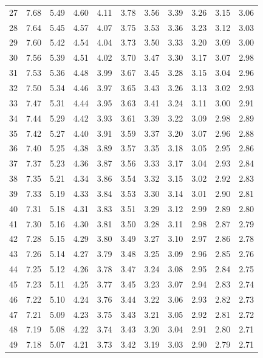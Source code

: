 \documentclass[
]{book}
\theoremstyle{definition}
\theoremstyle{definition}
\theoremstyle{definition}
\theoremstyle{definition}
\theoremstyle{remark}
\begin{document}
\begin{longtable}[]{@{}ccccccccccc@{}}
27 & 7.68 & 5.49 & 4.60 & 4.11 & 3.78 & 3.56 & 3.39 & 3.26 & 3.15 & 3.06 \\
28 & 7.64 & 5.45 & 4.57 & 4.07 & 3.75 & 3.53 & 3.36 & 3.23 & 3.12 & 3.03 \\
29 & 7.60 & 5.42 & 4.54 & 4.04 & 3.73 & 3.50 & 3.33 & 3.20 & 3.09 & 3.00 \\
30 & 7.56 & 5.39 & 4.51 & 4.02 & 3.70 & 3.47 & 3.30 & 3.17 & 3.07 & 2.98 \\
31 & 7.53 & 5.36 & 4.48 & 3.99 & 3.67 & 3.45 & 3.28 & 3.15 & 3.04 & 2.96 \\
32 & 7.50 & 5.34 & 4.46 & 3.97 & 3.65 & 3.43 & 3.26 & 3.13 & 3.02 & 2.93 \\
33 & 7.47 & 5.31 & 4.44 & 3.95 & 3.63 & 3.41 & 3.24 & 3.11 & 3.00 & 2.91 \\
34 & 7.44 & 5.29 & 4.42 & 3.93 & 3.61 & 3.39 & 3.22 & 3.09 & 2.98 & 2.89 \\
35 & 7.42 & 5.27 & 4.40 & 3.91 & 3.59 & 3.37 & 3.20 & 3.07 & 2.96 & 2.88 \\
36 & 7.40 & 5.25 & 4.38 & 3.89 & 3.57 & 3.35 & 3.18 & 3.05 & 2.95 & 2.86 \\
37 & 7.37 & 5.23 & 4.36 & 3.87 & 3.56 & 3.33 & 3.17 & 3.04 & 2.93 & 2.84 \\
38 & 7.35 & 5.21 & 4.34 & 3.86 & 3.54 & 3.32 & 3.15 & 3.02 & 2.92 & 2.83 \\
39 & 7.33 & 5.19 & 4.33 & 3.84 & 3.53 & 3.30 & 3.14 & 3.01 & 2.90 & 2.81 \\
40 & 7.31 & 5.18 & 4.31 & 3.83 & 3.51 & 3.29 & 3.12 & 2.99 & 2.89 & 2.80 \\
41 & 7.30 & 5.16 & 4.30 & 3.81 & 3.50 & 3.28 & 3.11 & 2.98 & 2.87 & 2.79 \\
42 & 7.28 & 5.15 & 4.29 & 3.80 & 3.49 & 3.27 & 3.10 & 2.97 & 2.86 & 2.78 \\
43 & 7.26 & 5.14 & 4.27 & 3.79 & 3.48 & 3.25 & 3.09 & 2.96 & 2.85 & 2.76 \\
44 & 7.25 & 5.12 & 4.26 & 3.78 & 3.47 & 3.24 & 3.08 & 2.95 & 2.84 & 2.75 \\
45 & 7.23 & 5.11 & 4.25 & 3.77 & 3.45 & 3.23 & 3.07 & 2.94 & 2.83 & 2.74 \\
46 & 7.22 & 5.10 & 4.24 & 3.76 & 3.44 & 3.22 & 3.06 & 2.93 & 2.82 & 2.73 \\
47 & 7.21 & 5.09 & 4.23 & 3.75 & 3.43 & 3.21 & 3.05 & 2.92 & 2.81 & 2.72 \\
48 & 7.19 & 5.08 & 4.22 & 3.74 & 3.43 & 3.20 & 3.04 & 2.91 & 2.80 & 2.71 \\
49 & 7.18 & 5.07 & 4.21 & 3.73 & 3.42 & 3.19 & 3.03 & 2.90 & 2.79 & 2.71 \\

\end{longtable}
\end{document}
